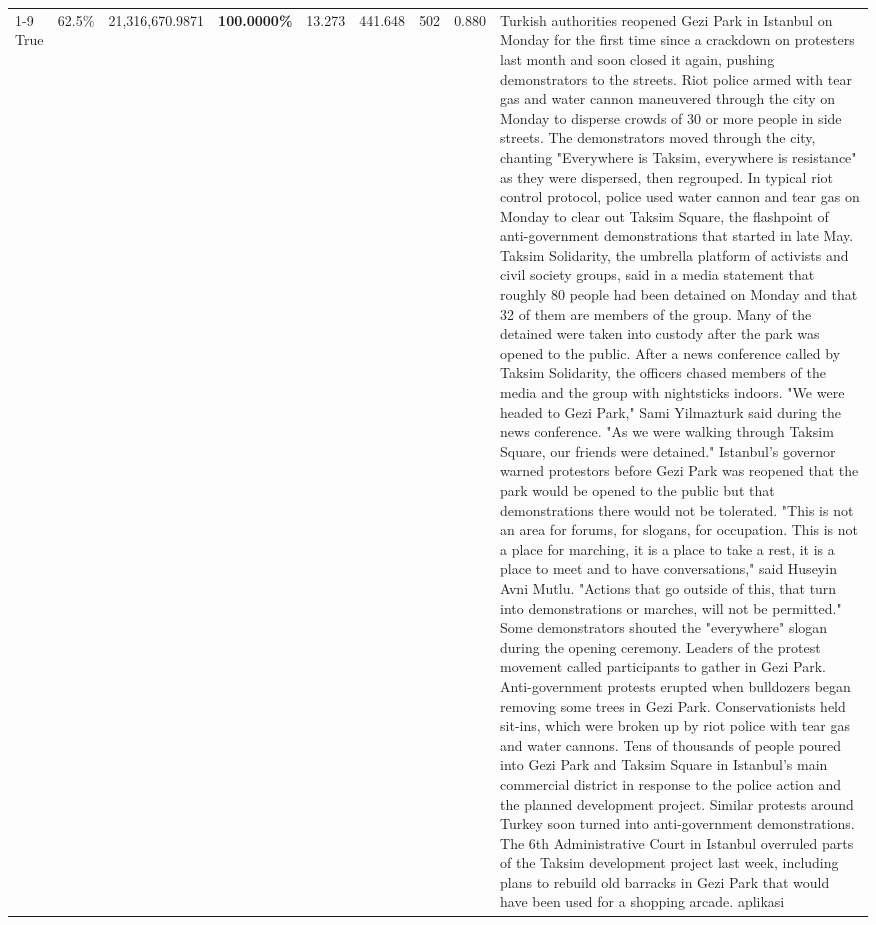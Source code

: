 \begin{table}[H]
\begin{tabular}{lllrlllll}
\cline{1-9}
True & 62.5\% & 21,316,670.9871 & \bfseries \color{red} 100.0000\% & 13.273 & 441.648 & 502 & 0.880 & Turkish authorities reopened Gezi Park in Istanbul on Monday for the first time since a crackdown on protesters last month and soon closed it again, pushing demonstrators to the streets. Riot police armed with tear gas and water cannon maneuvered through the city on Monday to disperse crowds of 30 or more people in side streets. The demonstrators moved through the city, chanting "Everywhere is Taksim, everywhere is resistance" as they were dispersed, then regrouped. In typical riot control protocol, police used water cannon and tear gas on Monday to clear out Taksim Square, the flashpoint of anti-government demonstrations that started in late May. Taksim Solidarity, the umbrella platform of activists and civil society groups, said in a media statement that roughly 80 people had been detained on Monday and that 32 of them are members of the group. Many of the detained were taken into custody after the park was opened to the public. After a news conference called by Taksim Solidarity, the officers chased members of the media and the group with nightsticks indoors. "We were headed to Gezi Park," Sami Yilmazturk said during the news conference. "As we were walking through Taksim Square, our friends were detained." Istanbul's governor warned protestors before Gezi Park was reopened that the park would be opened to the public but that demonstrations there would not be tolerated. "This is not an area for forums, for slogans, for occupation. This is not a place for marching, it is a place to take a rest, it is a place to meet and to have conversations," said Huseyin Avni Mutlu. "Actions that go outside of this, that turn into demonstrations or marches, will not be permitted." Some demonstrators shouted the "everywhere" slogan during the opening ceremony. Leaders of the protest movement called participants to gather in Gezi Park. Anti-government protests erupted when bulldozers began removing some trees in Gezi Park. Conservationists held sit-ins, which were broken up by riot police with tear gas and water cannons. Tens of thousands of people poured into Gezi Park and Taksim Square in Istanbul's main commercial district in response to the police action and the planned development project. Similar protests around Turkey soon turned into anti-government demonstrations. The 6th Administrative Court in Istanbul overruled parts of the Taksim development project last week, including plans to rebuild old barracks in Gezi Park that would have been used for a shopping arcade. aplikasi \\

\end{tabular}
\end{table}
